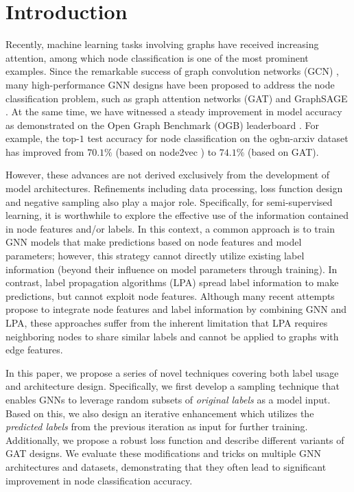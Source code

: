\documentclass[sigconf,screen,nonacm]{acmart} \usepackage{booktabs}
\begin{document}
	\section{Introduction}
	Recently, machine learning tasks involving graphs have received increasing attention, among which node classification is one of the most prominent examples.
	Since the remarkable success of graph convolution networks (GCN) \citep{kipf2016semi}, many high-performance GNN designs have been proposed to address the node classification problem, such as graph attention networks (GAT) \citep{velivckovic2017graph} and GraphSAGE \citep{hamilton2017inductive}.
	At the same time, we have witnessed a steady improvement in model accuracy as demonstrated on the Open Graph Benchmark (OGB) leaderboard \citep{hu2020open}.
	For example, the top-$1$ test accuracy for node classification on the ogbn-arxiv dataset has improved from $70.1\%$ (based on node2vec \citep{grover2016node2vec}) to $74.1\%$ (based on GAT).
	
	However, these advances are not derived exclusively from the development of model architectures.
	Refinements including data processing, loss function design and negative sampling also play a major role.
	Specifically, for semi-supervised learning, it is worthwhile to explore the effective use of the information contained in node features and/or labels.
	In this context, a common approach is to train GNN models that make predictions based on node features and model parameters; however, this strategy cannot directly utilize existing label information (beyond their influence on model parameters through training). 
	In contrast, label propagation algorithms (LPA) \citep{zhu2005semi} spread label information to make predictions, but cannot exploit node features.
Although many recent attempts \citep{klicpera2018predict,huang2020combining} propose to integrate node features and label information by combining GNN and LPA, these approaches suffer from the inherent limitation that LPA requires neighboring nodes to share similar labels and cannot be applied to graphs with edge features.
	
	In this paper, we propose a series of novel techniques covering both label usage and architecture design.
    Specifically, we first develop a sampling technique that enables GNNs to leverage random subsets of \emph{original labels} as a model input.
    Based on this, we also design an iterative enhancement which utilizes the \emph{predicted labels} from the previous iteration as input for further training.
    Additionally, we propose a robust loss function and describe different variants of GAT designs.
	We evaluate these modifications and tricks on multiple GNN architectures and datasets, demonstrating that they often lead to significant improvement in node classification accuracy.  
	
\end{document}

